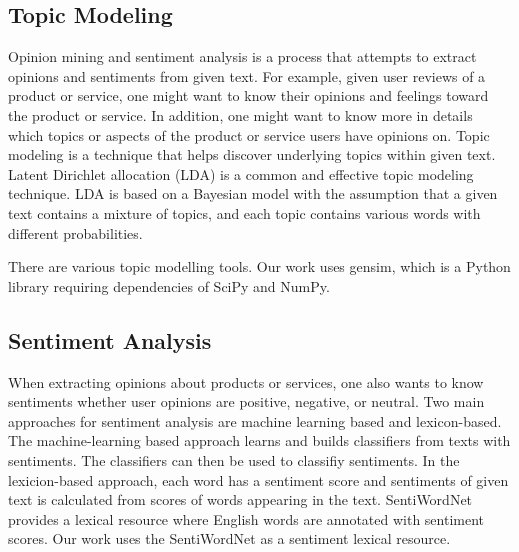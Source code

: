 

\subsection{Topic Modeling}

Opinion mining and sentiment analysis is a process that attempts to extract opinions and sentiments from given text\cite{surveyopinionmining}. For example, given user reviews of a product or service, one might want to know their opinions and feelings toward the product or service. In addition, one might want to know more in details which topics or aspects of the product or service users have opinions on. Topic modeling is a technique that helps discover underlying topics within given text. Latent Dirichlet allocation (LDA)\cite{LDA} is a common and effective topic modeling technique. LDA is based on a Bayesian model with the assumption that a given text contains a mixture of topics, and each topic contains various words with different probabilities.

There are various topic modelling tools. Our work uses gensim\cite{gensim}, which is a Python library requiring dependencies of SciPy and NumPy.

\subsection{Sentiment Analysis}

When extracting opinions about products or services, one also wants to know sentiments whether user opinions are positive, negative, or neutral. Two main approaches for sentiment analysis are machine learning based and lexicon-based. The machine-learning based approach learns and builds classifiers from texts with sentiments. The classifiers can then be used to classifiy sentiments. In the lexicion-based approach, each word has a sentiment score and sentiments of given text is calculated from scores of words appearing in the text. SentiWordNet~\cite{SentiWordNet} provides a lexical resource where English words are annotated with sentiment scores. Our work uses the SentiWordNet as a sentiment lexical resource.













